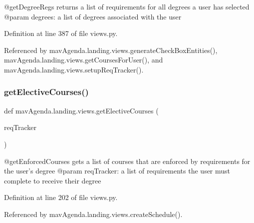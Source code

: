 \begin{DoxyVerb}@getDegreeRegs returns a list of requirements for all degrees a user has selected
@param degrees: a list of degrees associated with the user
\end{DoxyVerb}
 

Definition at line 387 of file views.\+py.



Referenced by mav\+Agenda.\+landing.\+views.\+generate\+Check\+Box\+Entities(), mav\+Agenda.\+landing.\+views.\+get\+Courses\+For\+User(), and mav\+Agenda.\+landing.\+views.\+setup\+Req\+Tracker().

\mbox{\label{namespacemavAgenda_1_1landing_1_1views_a093f67040145dbbb211f971ef3afb21c}} 
\subsubsection{\texorpdfstring{get\+Elective\+Courses()}{getElectiveCourses()}}
{\footnotesize\ttfamily def mav\+Agenda.\+landing.\+views.\+get\+Elective\+Courses (\begin{DoxyParamCaption}\item[{}]{req\+Tracker }\end{DoxyParamCaption})}

\begin{DoxyVerb}@getEnforcedCourses gets a list of courses that are enforced by requirements for the user's degree
@param reqTracker: a list of requirements the user must complete to receive their degree
\end{DoxyVerb}
 

Definition at line 202 of file views.\+py.



Referenced by mav\+Agenda.\+landing.\+views.\+create\+Schedule().

\mbox{\label{namespacemavAgenda_1_1landing_1_1views_a5e53a5236a02d3bd8bcdd5864a1d5eb5}} 
